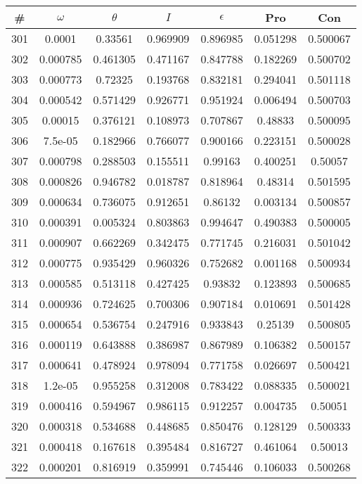 \newpage
\begin{table}
\begin{tabular}{c|c|c|c|c|c|c}
\# & $\omega$ & $\theta$ & $I$ & $\epsilon$ & Pro & Con\\
\hline
301 & 0.0001 & 0.33561 & 0.969909 & 0.896985 & 0.051298 & 0.500067\\
302 & 0.000785 & 0.461305 & 0.471167 & 0.847788 & 0.182269 & 0.500702\\
303 & 0.000773 & 0.72325 & 0.193768 & 0.832181 & 0.294041 & 0.501118\\
304 & 0.000542 & 0.571429 & 0.926771 & 0.951924 & 0.006494 & 0.500703\\
305 & 0.00015 & 0.376121 & 0.108973 & 0.707867 & 0.48833 & 0.500095\\
306 & 7.5e-05 & 0.182966 & 0.766077 & 0.900166 & 0.223151 & 0.500028\\
307 & 0.000798 & 0.288503 & 0.155511 & 0.99163 & 0.400251 & 0.50057\\
308 & 0.000826 & 0.946782 & 0.018787 & 0.818964 & 0.48314 & 0.501595\\
309 & 0.000634 & 0.736075 & 0.912651 & 0.86132 & 0.003134 & 0.500857\\
310 & 0.000391 & 0.005324 & 0.803863 & 0.994647 & 0.490383 & 0.500005\\
311 & 0.000907 & 0.662269 & 0.342475 & 0.771745 & 0.216031 & 0.501042\\
312 & 0.000775 & 0.935429 & 0.960326 & 0.752682 & 0.001168 & 0.500934\\
313 & 0.000585 & 0.513118 & 0.427425 & 0.93832 & 0.123893 & 0.500685\\
314 & 0.000936 & 0.724625 & 0.700306 & 0.907184 & 0.010691 & 0.501428\\
315 & 0.000654 & 0.536754 & 0.247916 & 0.933843 & 0.25139 & 0.500805\\
316 & 0.000119 & 0.643888 & 0.386987 & 0.867989 & 0.106382 & 0.500157\\
317 & 0.000641 & 0.478924 & 0.978094 & 0.771758 & 0.026697 & 0.500421\\
318 & 1.2e-05 & 0.955258 & 0.312008 & 0.783422 & 0.088335 & 0.500021\\
319 & 0.000416 & 0.594967 & 0.986115 & 0.912257 & 0.004735 & 0.50051\\
320 & 0.000318 & 0.534688 & 0.448685 & 0.850476 & 0.128129 & 0.500333\\
321 & 0.000418 & 0.167618 & 0.395484 & 0.816727 & 0.461064 & 0.50013\\
322 & 0.000201 & 0.816919 & 0.359991 & 0.745446 & 0.106033 & 0.500268\\

\end{tabular}
\end{table}
